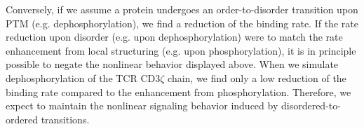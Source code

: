 \documentclass[../../AdvancementSummary.tex]{subfiles}
\begin{document}
Conversely, if we assume a protein undergoes an order-to-disorder transition upon PTM (e.g. dephosphorylation), we find a reduction of the binding rate.
	If the rate reduction upon disorder (e.g. upon dephosphorylation) were to match the rate enhancement from local structuring (e.g. upon phosphorylation), it is in principle possible to negate the nonlinear behavior displayed above.
	When we simulate dephosphorylation of the TCR CD3$\zeta$ chain, we find only a low reduction of the binding rate compared to the enhancement from phosphorylation.
	Therefore, we expect to maintain the nonlinear signaling behavior induced by disordered-to-ordered transitions.
	

%

%
\end{document}
